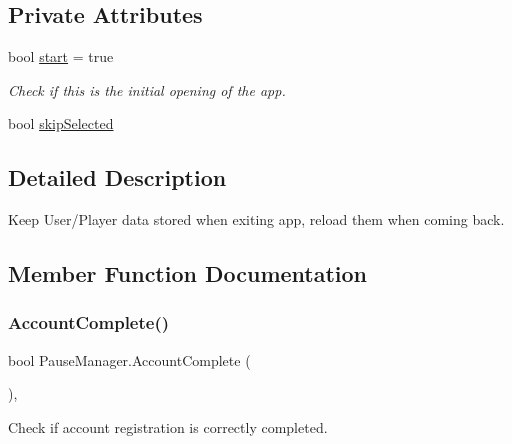 \subsection*{Private Attributes}
\begin{DoxyCompactItemize}
\item 
bool \mbox{\hyperlink{class_pause_manager_a01e84a6aa94c2e746f047af9dcb5a04c}{start}} = true
\begin{DoxyCompactList}\small\item\em Check if this is the initial opening of the app. \end{DoxyCompactList}\item 
bool \mbox{\hyperlink{class_pause_manager_a2d11f4fd49f97bd8ede5f9e0afda9601}{skip\+Selected}}
\end{DoxyCompactItemize}


\subsection{Detailed Description}
Keep User/\+Player data stored when exiting app, reload them when coming back. 

\subsection{Member Function Documentation}
\mbox{\label{class_pause_manager_a3afaaf8ca6d30581f6df12d900d0e1b5}} 
\subsubsection{\texorpdfstring{AccountComplete()}{AccountComplete()}}
{\footnotesize\ttfamily bool Pause\+Manager.\+Account\+Complete (\begin{DoxyParamCaption}{ }\end{DoxyParamCaption})\hspace{0.3cm}{\ttfamily [inline]}, {\ttfamily [private]}}



Check if account registration is correctly completed. 

\mbox{\label{class_pause_manager_a655b826847bdc4c8721d35aa47a4c880}} 
